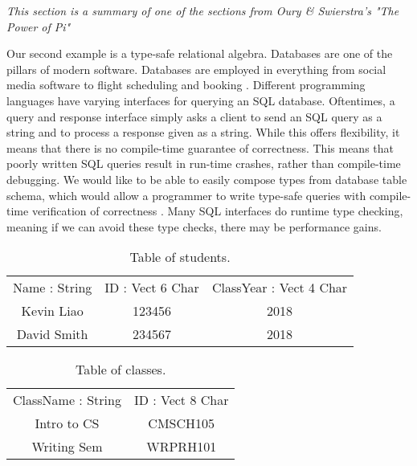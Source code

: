 \textit{This section is a summary of one of the sections from Oury \& Swierstra's
"The Power of Pi" \cite{power_of_pi}}

Our second example is a type-safe relational algebra. Databases are one of the
pillars of modern software. Databases are employed in everything from social
media software \cite{tao} to flight scheduling and booking \cite{flights}.
Different programming languages have varying interfaces for querying an SQL
database. Oftentimes, a query and response interface simply asks a client to
send an SQL query as a string and to process a response given as a string. While
this offers flexibility, it means that there is no compile-time guarantee of
correctness. This means that poorly written SQL queries result in run-time
crashes, rather than compile-time debugging. We would like to be able to easily
compose types from database table schema, which would allow a programmer to
write type-safe queries with compile-time verification of correctness
\cite{power_of_pi}. Many SQL interfaces do runtime type checking, meaning if we
can avoid these type checks, there may be performance gains. 

\begin{table}[h]
    \centering
    \begin{tabular}{|c|c|c|}
        Name : String & ID : Vect 6 Char & ClassYear : Vect 4 Char \\
        Kevin Liao    & 123456           & 2018                    \\
        David Smith   & 234567           & 2018
    \end{tabular}
    \caption{Table of students.}
    \label{students}
\end{table}

\begin{table}[h]
    \centering
    \begin{tabular}{|c|c|}
        ClassName : String & ID : Vect 8 Char\\
        Intro to CS        & CMSCH105        \\
        Writing Sem        & WRPRH101
    \end{tabular}
    \caption{Table of classes.}
    \label{classes}
\end{table}

